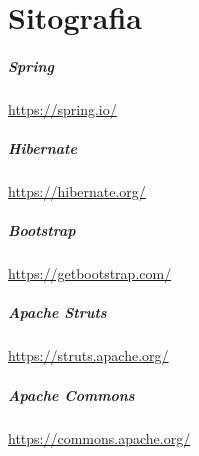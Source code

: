 \cleardoublepage
\chapter{Sitografia}

\nocite{*}

\printbibliography[heading=subbibliography,title={Riferimenti bibliografici},type=book]

\printbibliography[heading=subbibliography,title={Siti web consultati},type=online]

\paragraph*{Spring} \url{https://spring.io/}
\label{para:spring-site}

\paragraph*{Hibernate} \url{https://hibernate.org/}
\label{para:hibernate-site}

\paragraph*{Bootstrap} \url{https://getbootstrap.com/}
\label{para:bootstrap-site}

\paragraph*{Apache Struts} \url{https://struts.apache.org/}
\label{para:struts-site}

\paragraph*{Apache Commons} \url{https://commons.apache.org/}
\label{para:commons-site}